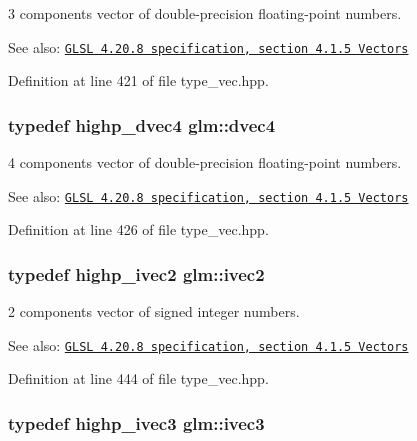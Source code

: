 3 components vector of double-precision floating-point numbers.

\begin{Desc}
\item[See also:]\href{http://www.opengl.org/registry/doc/GLSLangSpec.4.20.8.pdf}{\tt GLSL 4.20.8 specification, section 4.1.5 Vectors} \end{Desc}


Definition at line 421 of file type\_\-vec.hpp.\hypertarget{group__core__types_g0824ceed7ec3b2fba89765501c1540b5}{
\subsubsection[dvec4]{\setlength{\rightskip}{0pt plus 5cm}typedef highp\_\-dvec4 {\bf glm::dvec4}}}
\label{group__core__types_g0824ceed7ec3b2fba89765501c1540b5}


4 components vector of double-precision floating-point numbers.

\begin{Desc}
\item[See also:]\href{http://www.opengl.org/registry/doc/GLSLangSpec.4.20.8.pdf}{\tt GLSL 4.20.8 specification, section 4.1.5 Vectors} \end{Desc}


Definition at line 426 of file type\_\-vec.hpp.\hypertarget{group__core__types_g9e6ce9cfc7919976b318197e18d8a065}{
\subsubsection[ivec2]{\setlength{\rightskip}{0pt plus 5cm}typedef highp\_\-ivec2 {\bf glm::ivec2}}}
\label{group__core__types_g9e6ce9cfc7919976b318197e18d8a065}


2 components vector of signed integer numbers.

\begin{Desc}
\item[See also:]\href{http://www.opengl.org/registry/doc/GLSLangSpec.4.20.8.pdf}{\tt GLSL 4.20.8 specification, section 4.1.5 Vectors} \end{Desc}


Definition at line 444 of file type\_\-vec.hpp.\hypertarget{group__core__types_g6e12a4ca00d696f07da1df4eb73e0fe8}{
\subsubsection[ivec3]{\setlength{\rightskip}{0pt plus 5cm}typedef highp\_\-ivec3 {\bf glm::ivec3}}}
\label{group__core__types_g6e12a4ca00d696f07da1df4eb73e0fe8}


